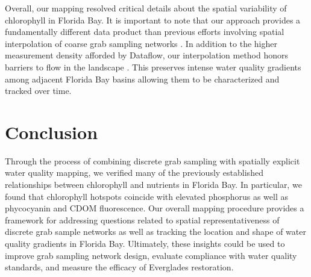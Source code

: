 Overall, our mapping resolved critical details about the spatial variability of chlorophyll in Florida Bay. It is important to note that our approach provides a fundamentally different data product than previous efforts involving spatial interpolation of coarse grab sampling networks \citep{fourqurean1993process}. In addition to the higher measurement density afforded by Dataflow, our interpolation method honors barriers to flow in the landscape \citep{stachelek_application_2015}. This preserves intense water quality gradients among adjacent Florida Bay basins allowing them to be characterized and tracked over time.
	
\section{Conclusion}
\label{conclusion}

	Through the process of combining discrete grab sampling with spatially explicit water quality mapping, we verified many of the previously established relationships between chlorophyll and nutrients in Florida Bay. In particular, we found that chlorophyll hotspots coincide with elevated phosphorus as well as phycocyanin and CDOM fluorescence. Our overall mapping procedure provides a framework for addressing questions related to spatial representativeness of discrete grab sample networks as well as tracking the location and shape of water quality gradients in Florida Bay. Ultimately, these insights could be used to improve grab sampling network design, evaluate compliance with water quality standards, and measure the efficacy of Everglades restoration.


%

%



